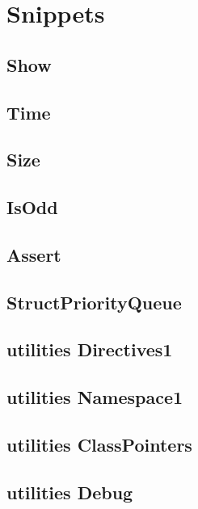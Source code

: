 \section{Snippets}
\subsection{ Show}
\raggedbottom
\hrulefill
\subsection{ Time}
\raggedbottom
\hrulefill
\subsection{ Size}
\raggedbottom
\hrulefill
\subsection{ IsOdd}
\raggedbottom
\hrulefill
\subsection{ Assert}
\raggedbottom
\hrulefill
\subsection{ StructPriorityQueue}
\raggedbottom
\hrulefill
\subsection{utilities Directives1}
\raggedbottom
\hrulefill
\subsection{utilities Namespace1}
\raggedbottom
\hrulefill
\subsection{utilities ClassPointers}
\raggedbottom
\hrulefill
\subsection{utilities Debug}
\raggedbottom
\hrulefill
